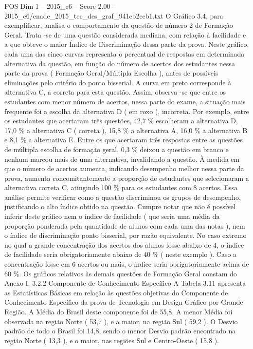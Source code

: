 \begin{textsample}{POS Dim 1 – 2015\_c6 – Score 2.00 – 2015\_c6/enade\_2015\_tec\_des\_graf\_941cb2ecb1.txt}
O Gráfico 3.4, para exemplificar, analisa o comportamento da questão de número 2 de Formação Geral.
Trata -se de uma questão considerada mediana, com relação à facilidade e a que obteve o maior Índice de Discriminação dessa parte da prova.
Neste gráfico, cada uma das cinco curvas representa o percentual de respostas em determinada alternativa da questão, em função do número de acertos dos estudantes nessa parte da prova ( Formação Geral/Múltipla Escolha ), antes de possíveis eliminações pelo critério do ponto bisserial.
A curva em preto corresponde à alternativa C, a correta para esta questão.
Assim, observa -se que entre os estudantes com menor número de acertos, nessa parte do exame, a situação mais frequente foi a escolha da alternativa D ( em roxo ), incorreta.
Por exemplo, entre os estudantes que acertaram três questões, 42,7 \% escolheram a alternativa D, 17,0 \% a alternativa C ( correta ), 15,8 \% a alternativa A, 16,0 \% a alternativa B e 8,1 \% a alternativa E.
Entre os que acertaram três respostas entre as questões de múltipla escolha de formação geral, 0,3 \% deixou a questão em branco e nenhum marcou mais de uma alternativa, invalidando a questão.
À medida em que o número de acertos aumenta, indicando desempenho melhor nessa parte da prova, aumenta concomitantemente a proporção de estudantes que selecionaram a alternativa correta C, atingindo 100 \% para os estudantes com 8 acertos.
Essa análise permite verificar como a questão discriminou os grupos de desempenho, justificando o alto índice obtido na questão.
Cumpre notar que não é possível inferir deste gráfico nem o índice de facilidade ( que seria uma média da proporção ponderada pela quantidade de alunos com cada uma das notas ), nem o índice de discriminação ponto bisserial, por razão equivalente.
No caso extremo no qual a grande concentração dos acertos dos alunos fosse abaixo de 4, o índice de facilidade seria obrigatoriamente abaixo de 40 \% ( neste exemplo ).
Caso a concentração fosse em 6 acertos ou mais, o índice seria obrigatoriamente acima de 60 \%.
Os gráficos relativos às demais questões de Formação Geral constam do Anexo I. 3.2.2 Componente de Conhecimento Específico A Tabela 3.11 apresenta as Estatísticas Básicas em relação às questões objetivas do Componente de Conhecimento Específico da prova de Tecnologia em Design Gráfico por Grande Região.
A Média do Brasil deste componente foi de 55,8.
A menor Média foi observada na região Norte ( 53,7 ), e a maior, na região Sul ( 59,2 ).
O Desvio padrão de todo o Brasil foi 14,8, sendo o menor Desvio padrão encontrado na região Norte ( 13,3 ), e o maior, nas regiões Sul e Centro-Oeste ( 15,8 ).

\end{textsample}

